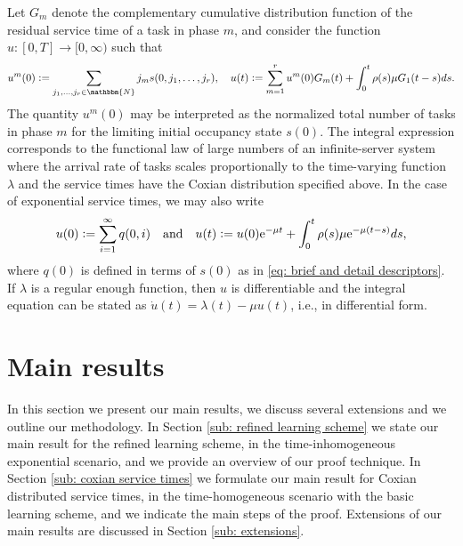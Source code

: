 \documentclass[a4paper, 12pt]{article}
\theoremstyle{definition}
\newcommand{\map}[3]{#1 : #2 \longrightarrow #3}
\newcommand{\defeq}{\vcentcolon=}
\newcommand{\N}{\mathbbm{N}}
\newcommand{\e}{\mathrm{e}}
\begin{document}
Let $G_m$ denote the complementary cumulative distribution function of the residual service time of a task in phase $m$, and consider the function $\map{u}{[0, T]}{[0, \infty)}$ such that
\begin{equation}
	\label{eq: general total number of tasks}
	u^m(0) \defeq \sum_{j_1, \dots, j_r \in \N} j_ms(0, j_1, \dots, j_r), \quad u(t) \defeq \sum_{m = 1}^r u^m(0)G_m(t) + \int_0^t \rho(s) \mu G_1(t - s)ds.
\end{equation}
The quantity $u^m(0)$ may be interpreted as the normalized total number of tasks in phase $m$ for the limiting initial occupancy state $s(0)$. The integral expression corresponds to the functional law of large numbers of an infinite-server system where the arrival rate of tasks scales proportionally to the time-varying function $\lambda$ and the service times have the Coxian distribution specified above. In the case of exponential service times, we may also write
\begin{equation}
	\label{eq: total number of tasks}
	u(0) \defeq \sum_{i = 1}^\infty q(0, i) \quad \text{and} \quad u(t) \defeq u(0)\e^{-\mu t} + \int_0^t \rho(s) \mu \e^{-\mu(t - s)}ds,
\end{equation}
where $q(0)$ is defined in terms of $s(0)$ as in \eqref{eq: brief and detail descriptors}. If $\lambda$ is a regular enough function, then $u$ is differentiable and the integral equation can be stated as $\dot{u}(t) = \lambda(t) - \mu u(t)$, i.e., in differential form.

\section{Main results}
\label{sec: main results}

In this section we present our main results, we discuss several extensions and we outline our methodology. In Section \ref{sub: refined learning scheme} we state our main result for the refined learning scheme, in the time-inhomogeneous exponential scenario, and we provide an overview of our proof technique. In Section \ref{sub: coxian service times} we formulate our main result for Coxian distributed service times, in the time-homogeneous scenario with the basic learning scheme, and we indicate the main steps of the proof. Extensions of our main results are discussed in Section \ref{sub: extensions}.
\end{document}
